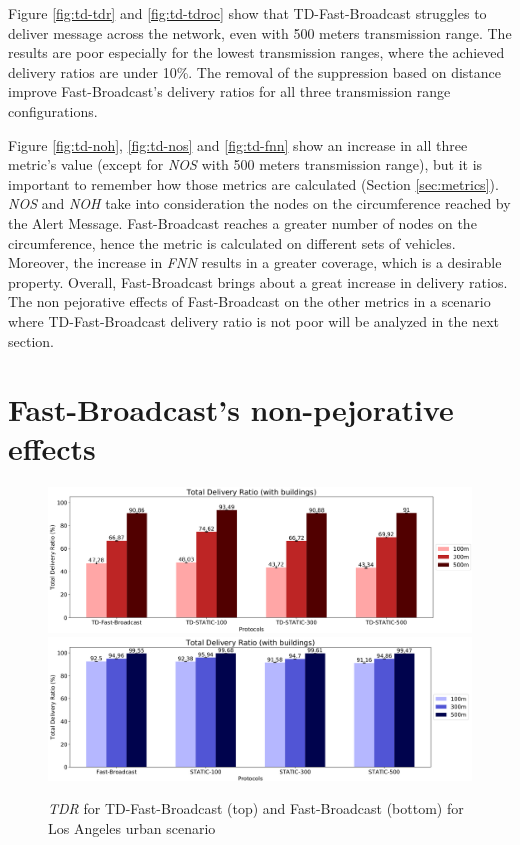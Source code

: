 	Figure \ref{fig:td-tdr} and \ref{fig:td-tdroc} show that TD-Fast-Broadcast struggles to deliver message across the network, even with 500 meters transmission range. The results are poor especially for the lowest transmission ranges, where the achieved delivery ratios are under 10\%. The removal of the suppression based on distance improve Fast-Broadcast's delivery ratios for all three transmission range configurations. 
	
	
	Figure \ref{fig:td-noh}, \ref{fig:td-nos} and \ref{fig:td-fnn} show an increase in all three metric's value (except for \textit{NOS} with 500 meters transmission range), but it is important to remember how those metrics are calculated (Section \ref{sec:metrics}). \textit{NOS} and \textit{NOH} take into consideration the nodes on the circumference reached by the Alert Message. Fast-Broadcast reaches a greater number of nodes on the circumference, hence the metric is calculated on different sets of vehicles. Moreover, the increase in \textit{FNN} results in a greater coverage, which is a desirable property. Overall, Fast-Broadcast brings about a great increase in delivery ratios. The non pejorative effects of Fast-Broadcast on the other metrics in a scenario where TD-Fast-Broadcast delivery ratio is not poor will be analyzed in the next section.
	
	\section{Fast-Broadcast's non-pejorative effects}
		\begin{figure}[H]
			\centering	
			\includegraphics[width=1.0\textwidth]{immagini/td-fb-la/td-fb/tdr}
			\includegraphics[width=1.0\textwidth]{immagini/td-fb-la/fb/tdr}
			\caption{\textit{TDR} for TD-Fast-Broadcast (top) and Fast-Broadcast (bottom) for Los Angeles urban scenario}
			\label{fig:la-td-tdr}
		\end{figure}
			

